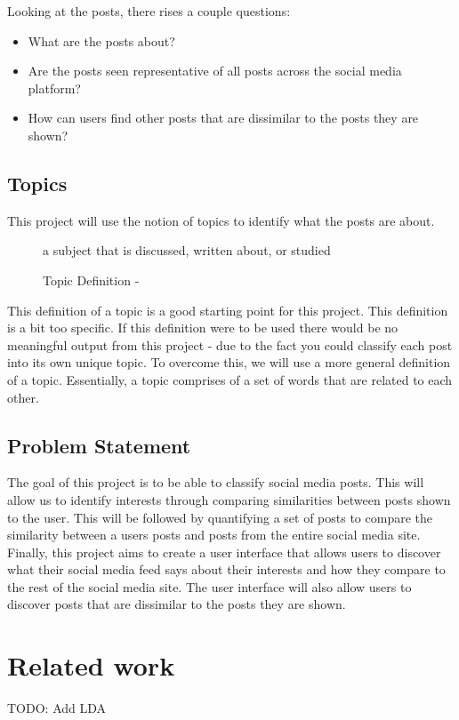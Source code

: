 Looking at the posts, there rises a couple questions:
\begin{itemize}
    \item What are the posts about?
    \item Are the posts seen representative of all posts across the social media platform?
    \item How can users find other posts that are dissimilar to the posts they are shown?
\end{itemize}

\subsection{Topics}
This project will use the notion of topics to identify what the posts are about.
\begin{figure}[hbtp]
    \centering
    a subject that is discussed, written about, or studied
    \caption{Topic Definition - \cite{cambdict}}
    \label{fig:topic_definition}
\end{figure}

This definition of a topic is a good starting point for this project. This definition is a bit too specific. If this definition were 
to be used there would be no meaningful output from this project - due to the fact you could classify each post into its own unique
topic. To overcome this, we will use a more general definition of a topic. Essentially, a topic comprises of a set of words that
are related to each other.

\subsection{Problem Statement}
The goal of this project is to be able to classify social media posts. This will allow us to identify interests through comparing
similarities between posts shown to the user. This will be followed by quantifying a set of posts to compare the similarity between
a users posts and posts from the entire social media site. Finally, this project aims to create a user interface that allows users
to discover what their social media feed says about their interests and how they compare to the rest of the social media site. The
user interface will also allow users to discover posts that are dissimilar to the posts they are shown.


\section{Related work}
TODO: Add LDA
